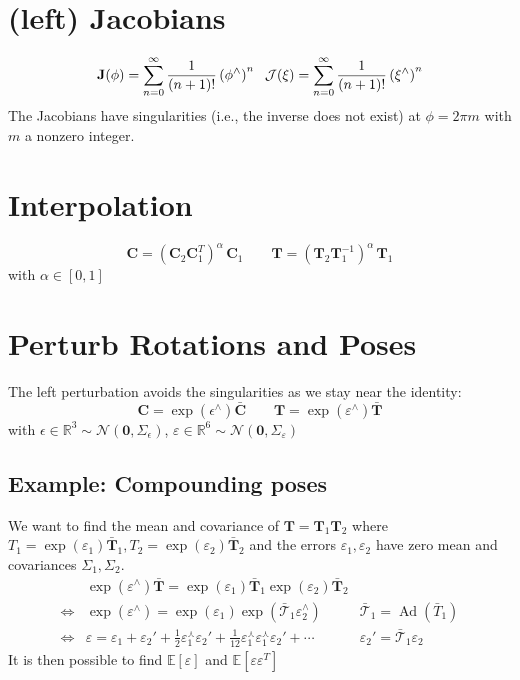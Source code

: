 \documentclass[12pt,landscape,a4paper]{article}
\newcommand{\R}{\mathbb{R}}
\newcommand{\vzero}{\mathbf{0}}
\newcommand{\C}{\mathbf{C}}
\newcommand{\T}{\mathbf{T}}
\newcommand{\J}{\mathbf{J}}
\newcommand{\Jc}{\mathcal{J}}
\DeclareMathOperator{\Ad}{Ad}
\begin{document}
\begin{multicols*}{3}
	\section{(left) Jacobians}
$$\begin{aligned}
	\J(\phi) = \sum_{n=0}^\infty \frac{1}{(n+1)!} \left(\phi^\wedge\right)^n \hskip.6em 
	\Jc(\xi)= \sum_{n=0}^\infty \frac{1}{(n+1)!} \left(\xi^\wedge\right)^n 
\end{aligned}$$
	The Jacobians have singularities (i.e., the inverse does not exist) at $\phi=2\pi m$ with $m$ a nonzero integer.

\section{Interpolation}
	$$\C = (\C_2\C_1^T)^\alpha\,\C_1 \qquad \T = (\T_2\T_1^{-1})^\alpha\,\T_1$$
	with $\alpha\in[0,1]$

\section{Perturb Rotations and Poses}
	The left perturbation avoids the singularities as we stay near the identity:
	$$\C = \exp(\epsilon^\wedge)\bar{\C} \qquad \T = \exp(\varepsilon^\wedge)\bar{\T}$$
	with $\epsilon\in\R^3\sim \mathcal{N}(\vzero,\Sigma_\epsilon)$, $\varepsilon\in\R^6\sim \mathcal{N}(\vzero,\Sigma_\varepsilon)$
	\subsection{Example: Compounding poses}
	We want to find the mean and covariance of $\T=\T_1\T_2$ where $T_1=\exp(\varepsilon_1)\bar{\T}_1, T_2=\exp(\varepsilon_2)\bar{\T}_2$ and the errors $\varepsilon_1, \varepsilon_2$ have zero mean and covariances $\Sigma_1,\Sigma_2$.
	$$\begin{aligned}
		&\exp(\varepsilon^\wedge)\bar{\T} =  \exp(\varepsilon_1)\bar{\T}_1\exp(\varepsilon_2)\bar{\T}_2 \\
		\Leftrightarrow& \exp(\varepsilon^\wedge) = \exp(\varepsilon_1)\exp(\bar{\mathcal{T}}_1\varepsilon_2^\wedge) &\bar{\mathcal{T}}_1=\Ad(\bar{T}_1) \\
		\Leftrightarrow& \varepsilon = \varepsilon_1+\varepsilon_2'+\frac12\varepsilon_1^\curlywedge\varepsilon_2'+\frac{1}{12}\varepsilon_1^\curlywedge\varepsilon_1^\curlywedge\varepsilon_2' + \cdots &\varepsilon_2'=\bar{\mathcal{T}}_1\varepsilon_2
	\end{aligned}$$
	It is then possible to find $\mathbb{E}[\varepsilon]$ and $\mathbb{E}[\varepsilon\varepsilon^T]$

\end{multicols*}
\end{document}
